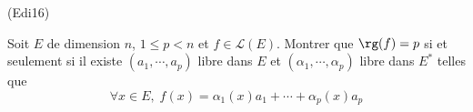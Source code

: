 \begin{tiny}(Edi16)\end{tiny} Soit $E$ de dimension $n$, $1 \leq p < n$ et $f\in \mathcal{L}(E)$. Montrer que $\rg(f)=p$  si et seulement si il existe $(a_1,\cdots,a_p)$ libre dans $E$ et $(\alpha_1,\cdots,\alpha_p)$ libre dans $E^*$ telles que
\begin{displaymath}
  \forall x \in E,\; f(x) = \alpha_1(x)a_1 + \cdots + \alpha_p(x) a_p
\end{displaymath}